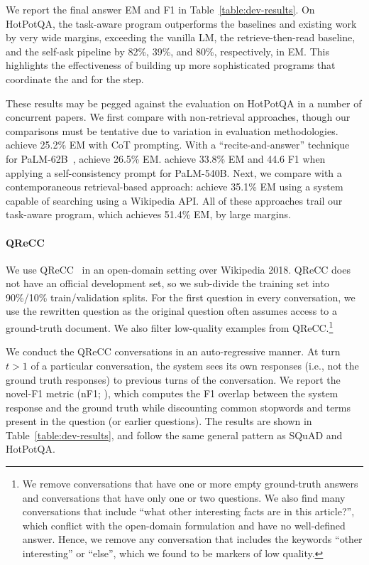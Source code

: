 We report the final answer EM and F1 in Table~\ref{table:dev-results}. On HotPotQA, the task-aware \DSP program outperforms the baselines and existing work by very wide margins, exceeding the vanilla LM, the retrieve-then-read baseline, and the self-ask pipeline by 82\%, 39\%, and 80\%, respectively, in EM. This highlights the effectiveness of building up more sophisticated programs that coordinate the \LM{} and \RM{} for the \search step.

These results may be pegged against the evaluation on HotPotQA in a number of concurrent papers. We first compare with non-retrieval approaches, though our comparisons must be tentative due to variation in evaluation methodologies. \citet{si2022prompting} achieve 25.2\% EM with CoT prompting. With a ``recite-and-answer'' technique for PaLM-62B~\cite{chowdhery2022palm}, \citet{sun2022recitation} achieve 26.5\% EM. \citet{wang2022rationale} achieve 33.8\% EM and 44.6 F1 when applying a self-consistency prompt for PaLM-540B. Next, we compare with a contemporaneous retrieval-based approach: \citet{yao2022react} achieve 35.1\% EM using a system capable of searching using a Wikipedia API. All of these approaches trail our task-aware \DSP program, which achieves 51.4\% EM, by large margins.

\paragraph{QReCC} We use QReCC~\cite{anantha2020open} in an open-domain setting over Wikipedia 2018. QReCC does not have an official development set, so we sub-divide the training set into 90\%/10\% train/validation splits. For the first question in every conversation, we use the rewritten question as the original question often assumes access to a ground-truth document. We also filter low-quality examples from QReCC.\footnote{We remove conversations that have one or more empty ground-truth answers and conversations that have only one or two questions. We also find many conversations that include ``what other interesting facts are in this article?'', which conflict with the open-domain formulation and have no well-defined answer. Hence, we remove any conversation that includes the keywords ``other interesting'' or ``else'', which we found to be markers of low quality.}


We conduct the QReCC conversations in an auto-regressive manner. At turn $t > 1$ of a particular conversation, the system sees its own responses (i.e., not the ground truth responses) to previous turns of the conversation. We report the novel-F1 metric (nF1; \citealt{paranjape2021hindsight}), which computes the F1 overlap between the system response and the ground truth while discounting common stopwords and terms present in the question (or earlier questions). The results are shown in Table~\ref{table:dev-results}, and follow the same general pattern as SQuAD and HotPotQA.

